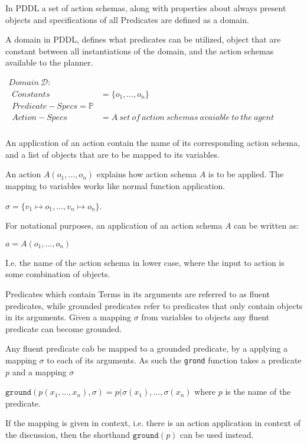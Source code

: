 \documentclass[../Master.tex]{subfiles}
\begin{document}
In PDDL a set of action schemas, along with properties about always present objects and specifications of all Predicates are defined as a domain.

\begin{definition} A domain in PDDL, defines what predicates can be utilized, object that are constant between all instantiations of the domain, and the action schemas available to the planner.
	
$
\begin{array}{ll}
Domain~\mathcal{D}: & \\

\begin{array}{ll}
Constants & = \{o_1,\dots,o_n\}			 \\  
Predicate-Specs = \mathbb{P} \\
Action-Specs & = A~set~of~action~schemas~avaiable~to~the~agent \\
\end{array}
\end{array}$
\end{definition}


	

An application of an action contain the name of its corresponding action schema, and a list of objects that are to be mapped to its variables.
\begin{definition} 
	An action $A(o_1,\dots,o_n)$ explains how action schema $A$ is to be applied. The mapping to variables works like normal function application. 
	
	$\sigma = \{ v_1 \mapsto o_1,\dots,v_n \mapsto o_n \}$.
	
	For notational purposes, an application of an action schema $A$ can be written as:
	
	$a = A(o_1,\dots,o_n)$ 
	
	I.e. the name of the action schema in lower case, where the input to action is some combination of objects.
	
	
	
\end{definition}


Predicates which contain Terms in its arguments are referred to as fluent predicates, while grounded predicates refer to predicates that only contain objects in its arguments. Given a mapping $\sigma$ from variables to objects any fluent predicate can become grounded.
\begin{definition} 
	Any fluent predicate cab be mapped to a grounded predicate, by a applying a mapping $\sigma$ to each of its arguments. As such the \texttt{grond} function takes a predicate $p$ and a mapping $\sigma$
	
		$\texttt{ground}(p(x_1,\dots,x_n),\sigma) = p(\sigma(x_1),\dots,\sigma(x_n)$ where $p$ is the name of the predicate.
		
	If the mapping is given in context, i.e. there is an action application in context of the discussion, then the shorthand $\texttt{ground}(p)$ can be used instead.
\end{definition}
\end{document}
